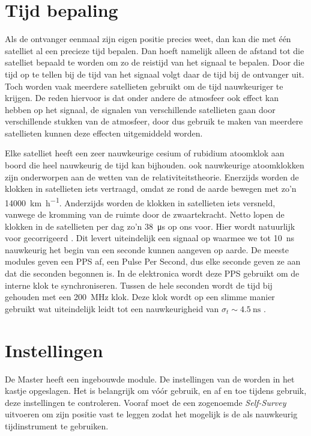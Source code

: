 \section{Tijd bepaling}

Als de ontvanger eenmaal zijn eigen positie precies weet, dan kan die
met één satelliet al een precieze tijd bepalen. Dan hoeft namelijk
alleen de afstand tot die satelliet bepaald te worden om zo de reistijd
van het signaal te bepalen. Door die tijd op te tellen bij de tijd van
het signaal volgt daar de tijd bij de ontvanger uit. Toch worden vaak
meerdere satellieten gebruikt om de tijd nauwkeuriger te krijgen. De
reden hiervoor is dat onder andere de atmosfeer ook effect kan hebben op
het signaal, de signalen van verschillende satellieten gaan door
verschillende stukken van de atmosfeer, door dus gebruik te maken van
meerdere satellieten kunnen deze effecten uitgemiddeld worden.

Elke \gps satelliet heeft een zeer nauwkeurige cesium of rubidium
atoomklok aan boord die heel nauwkeurig de tijd kan bijhouden. ook
nauwkeurige atoomklokken zijn onderworpen aan de wetten van de
relativiteitstheorie. Enerzijds worden de klokken in \gps satellieten
iets vertraagd, omdat ze rond de aarde bewegen met zo'n
\SI{14000}{\kilo\meter\per\hour}. Anderzijds worden de klokken in \gps
satellieten iets versneld, vanwege de kromming van de ruimte door de
zwaartekracht. Netto lopen de klokken in de \gps satellieten per dag
zo'n \SI{38}{\micro\second} op ons voor. Hier wordt natuurlijk voor
gecorrigeerd \cite{ashby1997gen}. Dit levert uiteindelijk een signaal op
waarmee we tot \SI{10}{\nano\second} nauwkeurig het begin van een
seconde kunnen aangeven op aarde. De meeste \gps modules geven een PPS
af, een Pulse Per Second, dus elke seconde geven ze aan dat die seconden
begonnen is. In de \hisparc elektronica wordt deze PPS gebruikt om de
interne klok te synchroniseren. Tussen de hele seconden wordt de tijd
bij gehouden met een \SI{200}{\mega\hertz} klok. Deze klok wordt op een
slimme manier gebruikt wat uiteindelijk leidt tot een nauwkeurigheid van
$\sigma_t\sim\SI{4.5}{\nano\second}$ \cite{trimble2007res}.


\section{Instellingen}

De \hisparc Master heeft een ingebouwde \gps module. De instellingen van
de \gps worden in het kastje opgeslagen. Het is belangrijk om vóór gebruik, en af
en toe tijdens gebruik, deze instellingen te controleren. Vooraf moet de
\gps een zogenoemde \emph{Self-Survey} uitvoeren om zijn positie vast te
leggen zodat het mogelijk is de \gps als nauwkeurig tijdinstrument te
gebruiken.

